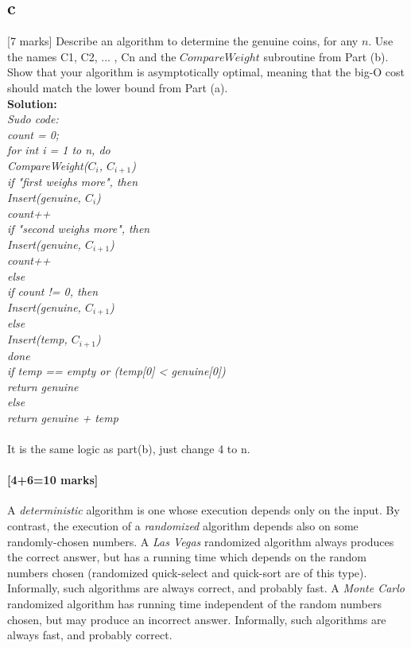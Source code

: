 \documentclass[12pt]{article}
\begin{document}
\begin{itemize}
\part{c} {[7 marks]} Describe an algorithm to determine the genuine
coins, for any $n$. Use the names C1, C2, ... , Cn and
the $CompareWeight$ subroutine from Part (b). Show that your algorithm is
asymptotically optimal, meaning that the big-O cost should match
the lower bound from Part (a).
\\\textbf{Solution:}
\\\textit{Sudo code:}
\\\textit{count = 0;
\\for int i = 1 to n, do
\\CompareWeight($C_i$, $C_{i+1}$)
\\if "first weighs more", then
\\Insert(genuine, $C_i$)
\\count++
\\if "second weighs more", then
\\Insert(genuine, $C_{i+1}$)
\\count++
\\else
\\if count != 0, then 
\\Insert(genuine, $C_{i+1}$)
\\else
\\Insert(temp, $C_{i+1}$)
\\done
\\if temp == empty or (temp[0] < genuine[0])
\\return genuine
\\else
\\return genuine + temp
}
\\
\\It is the same logic as part(b), just change 4 to n. 
\end{itemize}
\subsection{[4+6=10 marks]}
A \emph{deterministic} algorithm is one whose execution depends
only on the input. By contrast, the execution of a \emph{randomized}
algorithm depends also on some randomly-chosen numbers. A \emph{Las
Vegas} randomized algorithm always produces the correct answer, but
has a running time which depends on the random numbers chosen
(randomized quick-select and quick-sort are of this type). Informally,
such algorithms are always correct, and probably fast. A \emph{Monte
Carlo} randomized algorithm has running time independent of the
random numbers chosen, but may produce an incorrect answer. Informally,
such algorithms are always fast, and probably correct.
\end{document}
